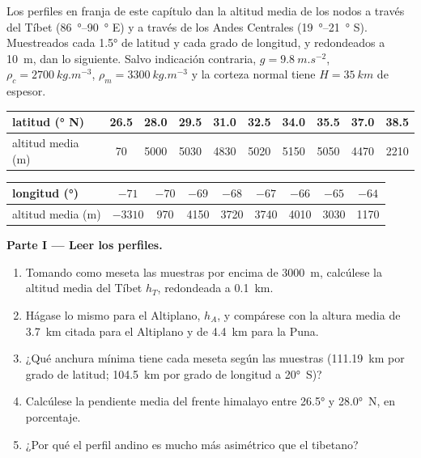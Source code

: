 \begin{problem}\label{pb:b2:himalaya-andes:1}
Los perfiles en franja de este capítulo dan la altitud media de los nodos a través del Tíbet
(\qtyrange{86}{90}{\degree} E) y a través de los Andes Centrales (\qtyrange{19}{21}{\degree} S).
Muestreados cada \ang{1.5} de latitud y cada grado de longitud, y redondeados a \qty{10}{m},
dan lo siguiente. Salvo indicación contraria, $g = \qty{9.8}{m.s^{-2}}$, $\rho_c = \qty{2700}{kg.m^{-3}}$,
$\rho_m = \qty{3300}{kg.m^{-3}}$ y la corteza normal tiene $H = \qty{35}{km}$ de espesor.

\smallskip
\begin{center}\small
\begin{tabular}{l|ccccccccc}
latitud (\unit{\degree} N) & 26.5 & 28.0 & 29.5 & 31.0 & 32.5 & 34.0 & 35.5 & 37.0 & 38.5 \\ \hline
altitud media (\unit{m}) & 70 & 5000 & 5030 & 4830 & 5020 & 5150 & 5050 & 4470 & 2210
\end{tabular}

\smallskip
\begin{tabular}{l|cccccccc}
longitud (\unit{\degree}) & $-71$ & $-70$ & $-69$ & $-68$ & $-67$ & $-66$ & $-65$ & $-64$ \\ \hline
altitud media (\unit{m}) & $-3310$ & 970 & 4150 & 3720 & 3740 & 4010 & 3030 & 1170
\end{tabular}
\end{center}
\smallskip

\noindent\textbf{Parte I --- Leer los perfiles.}
\begin{enumerate}
\item Tomando como meseta las muestras por encima de \qty{3000}{m}, calcúlese la altitud media del Tíbet
$h_T$, redondeada a \qty{0.1}{km}.
\item Hágase lo mismo para el Altiplano, $h_A$, y compárese con la altura media de
\qty{3.7}{km} citada para el Altiplano y de \qty{4.4}{km} para la Puna.
\item ¿Qué anchura mínima tiene cada meseta según las muestras (\qty{111.19}{km} por
grado de latitud; \qty{104.5}{km} por grado de longitud a \ang{20}~S)?
\item Calcúlese la pendiente media del frente himalayo entre \ang{26.5} y \ang{28.0}~N, en
porcentaje.
\item ¿Por qué el perfil andino es mucho más asimétrico que el tibetano?
\end{enumerate}


\end{problem}
